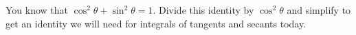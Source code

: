 You know that $\cos^2 \theta + \sin^2 \theta = 1$.  Divide this identity by $\cos^2\theta$ and simplify to get an identity we will need for integrals of tangents and secants today.
